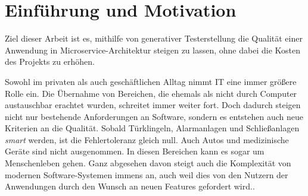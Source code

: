 \documentclass[12pt,a4paper,bibliography=totocnumbered,listof=totocnumbered]{scrartcl}
\begin{document}
\pagebreak




\renewcommand{\sectionmark}[1]{\markright{#1}}
\renewcommand{\subsectionmark}[1]{}
\renewcommand{\subsubsectionmark}[1]{}
\rhead{\rightmark}

\onehalfspacing
\renewcommand{\thesection}{\arabic{section}}
\renewcommand{\theHsection}{\arabic{section}}
\setcounter{section}{0}
\setcounter{page}{1}
\setcounter{secnumdepth}{6}

\section{Einführung und Motivation}

Ziel dieser Arbeit ist es, mithilfe von generativer Testerstellung die Qualität einer Anwendung in Microservice-Architektur steigen zu lassen, ohne dabei die Kosten des Projekts zu erhöhen.

Sowohl im privaten als auch geschäftlichen Alltag nimmt IT eine immer größere Rolle ein. Die Übernahme von Bereichen, die ehemals als nicht durch Computer austauschbar erachtet wurden, schreitet immer weiter fort. Doch dadurch steigen nicht nur bestehende Anforderungen an Software, sondern es entstehen auch neue Kriterien an die Qualität. Sobald Türklingeln, Alarmanlagen und Schließanlagen \textit{smart} werden, ist die Fehlertoleranz gleich null. Auch Autos und medizinische Geräte sind nicht ausgenommen. In diesen Bereichen kann es sogar um Menschenleben gehen. Ganz abgesehen davon steigt auch die Komplexität von modernen Software-Systemen immens an, auch weil dies von den Nutzern der Anwendungen durch den Wunsch an neuen Features gefordert wird.\cite{pantesting}.
\end{document}
